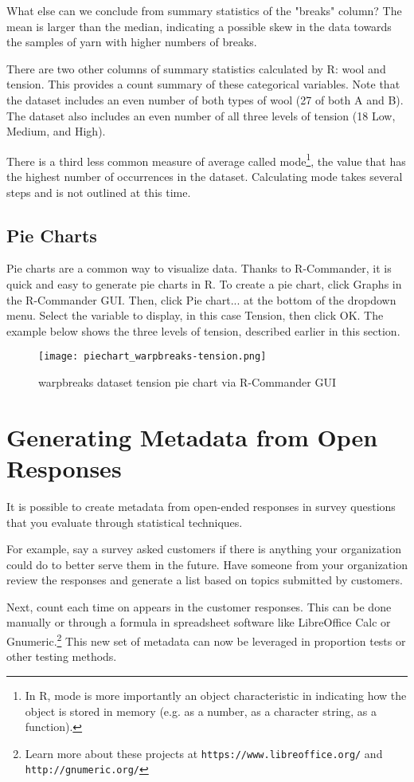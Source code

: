 What else can we conclude from summary statistics of the "breaks" column? The 
mean is larger than the median, indicating a possible skew in the data towards 
the samples of yarn with higher numbers of breaks.

There are two other columns of summary statistics calculated by R: wool and 
tension. This provides a count summary of these categorical variables. Note 
that the dataset includes an even number of both types of wool (27 of both A 
and B). The dataset also includes an even number of all three levels of tension
 (18 Low, Medium, and High).

There is a third less common measure of average called mode\footnote{In R, mode
 is more importantly an object characteristic in indicating how the object is 
 stored in memory (e.g. as a number, as a character string, as a function).}, 
 the value that has the highest number of occurrences in the dataset. 
 Calculating mode takes several steps and is not outlined at this time.


\subsection{Pie Charts}
Pie charts are a common way to visualize data. Thanks to R-Commander, it is 
quick and easy to generate pie charts in R. To create a pie chart, click Graphs
 in the R-Commander GUI. Then, click Pie chart... at the bottom of the dropdown
 menu. Select the variable to display, in this case Tension, then click OK. 
The example below shows the three levels of tension, described earlier in this 
section.

\begin{figure}[htbp]
\texttt{[image: piechart\_warpbreaks-tension.png]}
 \caption{warpbreaks dataset tension pie chart via R-Commander GUI}
 \label{fig:summary_warpbreaks}
\end{figure}

\section{Generating Metadata from Open Responses}
It is possible to create metadata from open-ended responses in survey questions
 that you evaluate through statistical techniques.

For example, say a survey asked customers if there is anything your 
organization could do to better serve them in the future. Have someone from 
your organization review the responses and generate a list based on topics 
submitted by customers. 

Next, count each time on appears in the customer responses. This can be done 
manually or through a formula in spreadsheet software like LibreOffice Calc or 
Gnumeric.\footnote{Learn more about these projects at 
\texttt{https://www.libreoffice.org/} and \texttt{http://gnumeric.org/}} This 
new set of metadata can now be leveraged in proportion tests or other testing 
methods.
